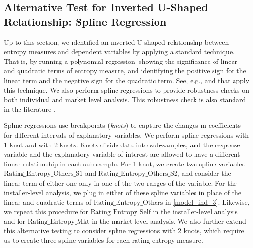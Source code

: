 \documentclass[msom,blindrev]{informs3}
\begin{document}
\subsection{Alternative Test for Inverted U-Shaped Relationship: Spline Regression}


Up to this section, we identified an inverted U-shaped relationship between entropy measures and dependent variables by applying a standard technique. That is, by running a polynomial regression, showing the significance of linear and quadratic terms of entropy measure, and identifying the positive sign for the linear term and the negative sign for the quadratic term. See, e.g., \cite{tan2014does} and \cite{kesavan2014volume} that apply this technique. We also perform spline regressions to provide robustness checks on both individual and market level analysis. This robustness check is also standard in the literature \citep{kesavan2014volume}.

Spline regressions use breakpoints (\emph{knots}) to capture the changes in coefficients for different intervals of explanatory variables. We perform spline regressions with 1 knot and with 2 knots. Knots divide data into sub-samples, and the response variable and the explanatory variable of interest are allowed to have a different linear relationship in each sub-sample. For 1 knot, we create two spline variables $\text{Rating\_Entropy\_Others\_S1}$ and  $\text{Rating\_Entropy\_Others\_S2}$, and consider the linear term of either one only in one of the two ranges of the variable. For the installer-level analysis, we plug in either of these spline variables in place of the linear and quadratic terms of $\text{Rating\_Entropy\_Others}$ in \ref{model_ind_3}.  Likewise, we repeat this procedure for $\text{Rating\_Entropy\_Self}$ in the installer-level analysis and  for $\text{Rating\_Entropy\_Mkt}$ in the market-level analysis. We also further extend this alternative testing to consider spline regressions with 2 knots, which require us to create three spline variables for each rating entropy measure.

\end{document}

